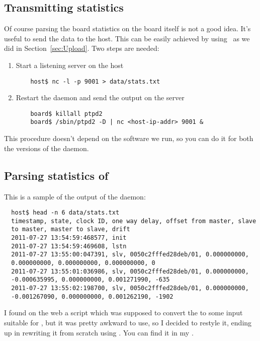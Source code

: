    \subsection{ Transmitting statistics }

        Of course parsing the board statistics on the board itself is not
        a good idea. It's useful to send the data to the host. This can be
        easily achieved by using \NetCat\ as we did in
        Section~\ref{sec:Upload}. Two steps are needed:
        \begin{enumerate}
        \item   Start a listening server on the host
\begin{lstlisting}
    host$ nc -l -p 9001 > data/stats.txt
\end{lstlisting}
        \item   Restart the daemon and send the output on the server
\begin{lstlisting}
    board$ killall ptpd2
    board$ /sbin/ptpd2 -D | nc <host-ip-addr> 9001 &
\end{lstlisting}
        \end{enumerate}
        This procedure doesn't depend on the software we run, so
        you can do it for both the versions of the daemon.

    \subsection{ Parsing statistics of \PTPd }

        This is a sample of the output of the daemon:
\begin{lstlisting}
  host$ head -n 6 data/stats.txt
  timestamp, state, clock ID, one way delay, offset from master, slave
  to master, master to slave, drift
  2011-07-27 13:54:59:468577, init
  2011-07-27 13:54:59:469608, lstn
  2011-07-27 13:55:00:047391, slv, 0050c2fffed28deb/01, 0.000000000,
  0.000000000, 0.000000000, 0.000000000, 0
  2011-07-27 13:55:01:036986, slv, 0050c2fffed28deb/01, 0.000000000,
  -0.000635995, 0.000000000, 0.001271990, -635
  2011-07-27 13:55:02:198700, slv, 0050c2fffed28deb/01, 0.000000000,
  -0.001267090, 0.000000000, 0.001262190, -1902
\end{lstlisting}

        I found on the web a  script which was supposed
        to convert the  to some input suitable for
        , but it was pretty awkward to use, so I decided
        to restyle it, ending up in rewriting it from scratch using
        . You can find it in my \MyRepo.

